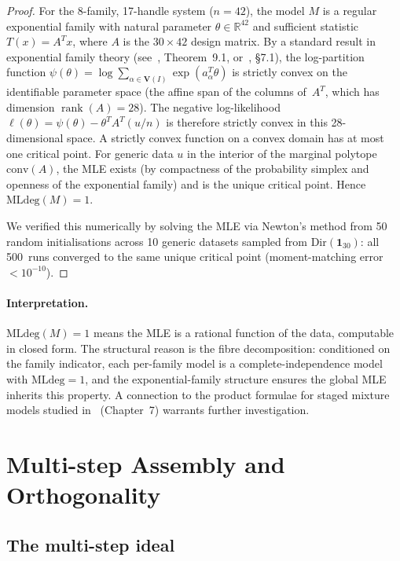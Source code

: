 \documentclass[preprint,12pt]{elsarticle}
\theoremstyle{definition}
\theoremstyle{remark}
\newcommand{\RR}{\mathbb{R}}
\newcommand{\Var}{\mathbf{V}}
\newcommand{\conv}{\mathrm{conv}}
\DeclareMathOperator{\rank}{rank}
\begin{document}
\begin{proof}
For the 8-family, 17-handle system ($n = 42$), the model $M$ is
a regular exponential family with natural parameter
$\theta \in \RR^{42}$ and sufficient statistic $T(x) = A^T x$,
where $A$ is the $30 \times 42$ design matrix.
By a standard result in exponential family theory
(see~\cite{BN78}, Theorem~9.1, or~\cite{DSS09}, \S7.1), the
log-partition function
$\psi(\theta) = \log \sum_{\alpha \in \Var(I)} \exp(a_\alpha^T \theta)$
is strictly convex on the identifiable parameter space
(the affine span of the columns of~$A^T$,
which has dimension $\rank(A) = 28$).
The negative log-likelihood $\ell(\theta) = \psi(\theta) - \theta^T A^T (u/n)$
is therefore strictly convex in this
28-dimensional space.  A strictly convex function on
a convex domain has at most one critical point.  For generic
data $u$ in the interior of the marginal polytope~$\conv(A)$,
the MLE exists (by compactness of the probability simplex and
openness of the exponential family) and is the unique critical
point.  Hence $\mathrm{MLdeg}(M) = 1$.

We verified this numerically by solving the MLE via Newton's
method from 50 random initialisations across 10 generic datasets
sampled from $\mathrm{Dir}(\mathbf{1}_{30})$: all 500~runs converged
to the same unique critical point (moment-matching error $< 10^{-10}$).
\end{proof}

\paragraph{Interpretation.}
$\mathrm{MLdeg}(M) = 1$ means the MLE is a rational function of
the data, computable in closed form.  The structural reason is the
fibre decomposition: conditioned on the family indicator, each
per-family model is a complete-independence model with
$\mathrm{MLdeg} = 1$, and the exponential-family structure
ensures the global MLE inherits this property.  A connection to the product formulae for staged mixture
models studied in~\cite{DSS09} (Chapter~7) warrants further
investigation.


\section{Multi-step Assembly and Orthogonality}\label{sec:multistep}

\subsection{The multi-step ideal}
\end{document}
